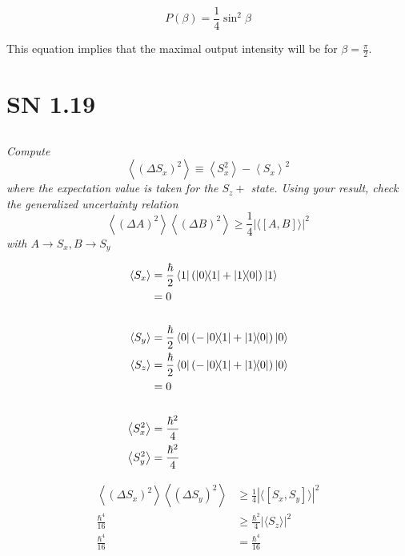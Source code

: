 \documentclass{article}
\begin{document}
$$\boxed{P(\beta) = \frac{1}{4}\sin^2 \beta }$$

This equation implies that the maximal output intensity will be for $\beta = \frac{\pi}{2}$.

\newpage

\section{SN 1.19}


\subsection{}
\textit{Compute
$$
\left\langle\left(\Delta S_{x}\right)^{2}\right\rangle \equiv\left\langle S_{x}^{2}\right\rangle-\left\langle S_{x}\right\rangle^{2}
$$
where the expectation value is taken for the $S_{z}+$ state. Using your result, check the generalized uncertainty relation
$$
\left\langle(\Delta A)^{2}\right\rangle\left\langle(\Delta B)^{2}\right\rangle \geq \frac{1}{4}|\langle[A, B]\rangle|^{2}
$$
with $A \rightarrow S_{x}, B \rightarrow S_{y}$}


\begin{align*}
    \left\langle S_{x}\right\rangle&=\frac{\hbar}{2}\bra{1}(\ketbra{0}{1}+\ketbra{1}{0})\ket{1}\\
    &= 0\\
    &\\ 
    \left\langle S_{y}\right\rangle&=\frac{\hbar}{2}\bra{0}(-\ketbra{0}{1}+\ketbra{1}{0})\ket{0}\\
    \left\langle S_{z}\right\rangle&=\frac{\hbar}{2}\bra{0}(-\ketbra{0}{1}+\ketbra{1}{0})\ket{0}\\
    &= 0\\
    &\\
    \left\langle S_{x}^{2}\right\rangle &= \frac{\hbar^2}{4}\\
    \left\langle S_{y}^{2}\right\rangle &= \frac{\hbar^2}{4}\\
\end{align*}

\begin{align*}
\left\langle(\Delta  S_{x})^{2}\right\rangle\left\langle(\Delta  S_{y})^{2}\right\rangle &\geq \frac{1}{4}|\langle[ S_{x},  S_{y}]\rangle|^{2}\\
\frac{\hbar^4}{16} &\geq \frac{\hbar^2}{4} |\langle S_{z}\rangle|^{2}\\
\frac{\hbar^4}{16} &= \frac{\hbar^4}{16} \\
\end{align*}
\end{document}
